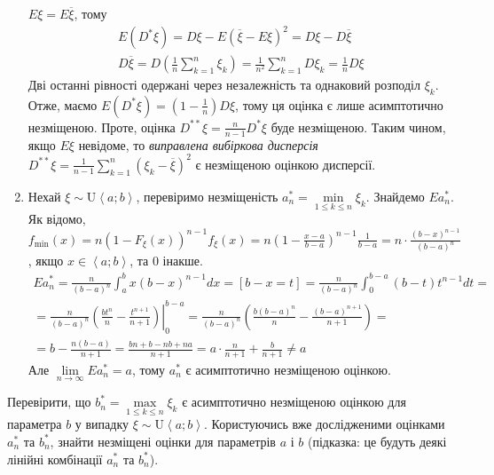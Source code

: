 \begin{example}
\begin{enumerate}
        $E\xi = E\overline{\xi}$, тому
        \begin{gather*}
            E\left( D^* \xi\right) = D\xi - E\left(\overline{\xi} - E\xi\right)^2= D\xi - D\overline{\xi} \\
            D\overline{\xi} = D\left(\frac{1}{n}\sum\limits_{k=1}^n \xi_k \right) = \frac{1}{n^2} \sum\limits_{k=1}^n D\xi_k = \frac{1}{n} D\xi
        \end{gather*}
        Дві останні рівності одержані через незалежність та однаковий розподіл $\xi_k$. Отже, маємо $E\left( D^* \xi\right) = \left( 1- \frac{1}{n}\right) D\xi$,
        тому ця оцінка є лише асимптотично незміщеною. Проте, оцінка $D^{**}\xi = \frac{n}{n-1} D^*\xi$ буде незміщеною.
        Таким чином, якщо $E\xi$ невідоме, то \emph{виправлена вибіркова дисперсія} 
        $D^{**}\xi = \frac{1}{n-1} \sum\limits_{k=1}^n \left(\xi_k - \overline{\xi} \right)^2$ є незміщеною оцінкою дисперсії.
        \item Нехай $\xi \sim \mathrm{U}\left< a; b\right>$, перевіримо незміщеність $a^*_n = \underset{1\leq k \leq n}{\min}\xi_k$.
        Знайдемо $Ea^*_n$. Як відомо, 
        $f_{\min}(x) = n \left(1-F_{\xi}(x)\right)^{n-1} f_{\xi}(x) = n\left( 1- \frac{x-a}{b-a}\right)^{n-1}\frac{1}{b-a} = n\cdot\frac{(b-x)^{n-1}}{(b-a)^n}$, якщо
        $x \in \left< a; b\right>$, та $0$ інакше.
        \begin{gather*}
            Ea^*_n = \frac{n}{(b-a)^n} \int_a^b x(b-x)^{n-1} dx = \left[ b-x = t \right] = 
            \frac{n}{(b-a)^n} \int_0^{b-a} (b-t)t^{n-1} dt = \\
            = \frac{n}{(b-a)^n} \left.\left( \frac{bt^n}{n} - \frac{t^{n+1}}{n+1}\right)\right|_0^{b-a} = 
            \frac{n}{(b-a)^n} \left(\frac{b(b-a)^n}{n} - \frac{(b-a)^{n+1}}{n+1}\right) = \\
            = b - \frac{n(b-a)}{n+1} = \frac{bn + b - nb + na}{n+1} = a \cdot \frac{n}{n+1} + \frac{b}{n+1} \neq a
         \end{gather*}
         Але $\underset{n\to\infty}{\lim} Ea^*_n = a$, тому $a^*_n$ є асимптотично незміщеною оцінкою.
    \end{enumerate}
 \end{example}
 \begin{exercise}
     Перевірити, що $b^*_n = \underset{1\leq k \leq n}{\max}\xi_k$ є асимптотично незміщеною оцінкою для параметра $b$ у випадку $\xi \sim \mathrm{U}\left< a; b\right>$.
     Користуючись вже дослідженими оцінками $a^*_n$ та $b^*_n$, знайти незміщені оцінки для параметрів $a$ і $b$ (підказка: це будуть деякі лінійні комбінації $a^*_n$ та $b^*_n$).
 \end{exercise}

